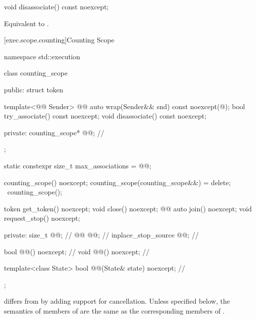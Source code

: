 %
\begin{itemdecl}
void disassociate() const noexcept;
\end{itemdecl}

\begin{itemdescr}
\pnum
\effects
Equivalent to .
\end{itemdescr}

[exec.scope.counting]{Counting Scope}

%
%
\begin{codeblock}
namespace std::execution {
  class counting_scope {
  public:
    struct token {
      template<@@ Sender>
        @@ auto wrap(Sender&& snd) const noexcept(@\seebelow@);
      bool try_associate() const noexcept;
      void disassociate() const noexcept;

    private:
      counting_scope* @@;                            // \expos
    };

    static constexpr size_t max_associations = @@;

    counting_scope() noexcept;
    counting_scope(counting_scope&&) = delete;
    ~counting_scope();

    token get_token() noexcept;
    void close() noexcept;
    @@ auto join() noexcept;
    void request_stop() noexcept;

  private:
    size_t @@;                                       // \expos
    @@ @@;                             // \expos
    inplace_stop_source @@;                       // \expos

    bool @@() noexcept;                      // \expos
    void @@() noexcept;                       // \expos

    template<class State>
      bool @@(State& state) noexcept;    // \expos
  };
}
\end{codeblock}

\pnum
{} differs from  by
adding support for cancellation.
Unless specified below, the semantics of members of 
are the same as the corresponding members of .

